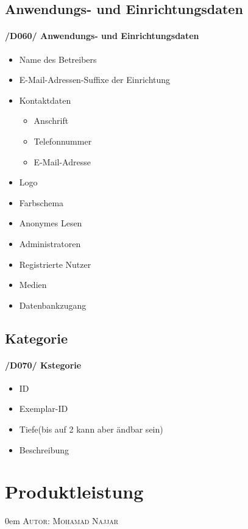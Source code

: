 \documentclass{article}
\makeatletter
\newcommand{\sectionauthor}[1]{
	{\parindent 0em \large \scshape Autor: #1 \par \nobreak \vspace*{2em}}
	\@afterheading
}
\makeatother
\begin{document}
	\subsection{Anwendungs- und Einrichtungsdaten}
	\label{D060} \paragraph{/D060/ Anwendungs- und Einrichtungsdaten}
	\begin{itemize}
		\item Name des Betreibers
		 
			\item E-Mail-Adressen-Suffixe der Einrichtung
		\item Kontaktdaten	
		\begin{itemize}
			\item Anschrift
			\item Telefonnummer
			\item E-Mail-Adresse
		\end{itemize}
		\item Logo
		\item Farbschema
		\item Anonymes Lesen
		\item Administratoren
		\item Registrierte Nutzer
		\item Medien
		\item Datenbankzugang
	\end{itemize}
\subsection{Kategorie}
	\label{D070} \paragraph{/D070/ Kstegorie}
	\begin{itemize}
	
	\item ID
	\item Exemplar-ID
	\item Tiefe(bis auf 2 kann aber ändbar sein)
	\item Beschreibung

	\end{itemize}	
\newpage

\section{Produktleistung} %
\sectionauthor{Mohamad Najjar}
\end{document}
